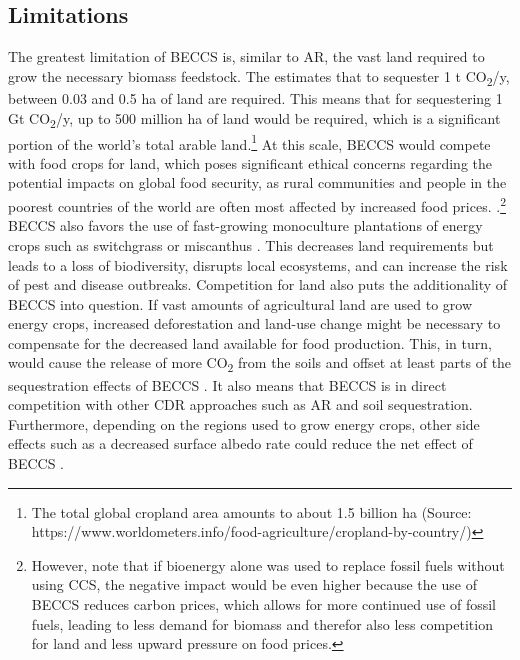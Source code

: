 \subsection*{Limitations}
The greatest limitation of BECCS is, similar to AR, the vast land required to grow the necessary biomass feedstock. The \textcite{IPCC2018Global1.5C} estimates that to sequester 1 t CO\textsubscript{2}/y, between 0.03 and 0.5 ha of land are required. This means that for sequestering 1 Gt CO\textsubscript{2}/y, up to 500 million ha of land would be required, which is a significant portion of the world's total arable land.\footnote{The total global cropland area amounts to about 1.5 billion ha (Source: https://www.worldometers.info/food-agriculture/cropland-by-country/)} At this scale, BECCS would compete with food crops for land, which poses significant ethical concerns regarding the potential impacts on global food security, as rural communities and people in the poorest countries of the world are often most affected by increased food prices. \parencite{Anderson2017TheBECCS, Hanssen2020TheStorage}.\footnote{However, \textcite{Muratori2016GlobalBECCS} note that if bioenergy alone was used to replace fossil fuels without using CCS, the negative impact would be even higher because the use of BECCS reduces carbon prices, which allows for more continued use of fossil fuels, leading to less demand for biomass and therefor also less competition for land and less upward pressure on food prices.}
BECCS also favors the use of fast-growing monoculture plantations of energy crops such as switchgrass or miscanthus \parencite{Fajardy2017CanEmissions}. This decreases land requirements but leads to a loss of biodiversity, disrupts local ecosystems, and can increase the risk of pest and disease outbreaks.
Competition for land also puts the additionality of BECCS into question. If vast amounts of agricultural land are used to grow energy crops, increased deforestation and land-use change might be necessary to compensate for the decreased land available for food production. This, in turn, would cause the release of more CO\textsubscript{2} from the soils and offset at least parts of the sequestration effects of BECCS \parencite{ChathamHouse2020ReachingWork, Muratori2016GlobalBECCS}. It also means that BECCS is in direct competition with other CDR approaches such as AR and soil sequestration.
Furthermore, depending on the regions used to grow energy crops, other side effects such as a decreased surface albedo rate could reduce the net effect of BECCS \parencite{Hanssen2020TheStorage}.

